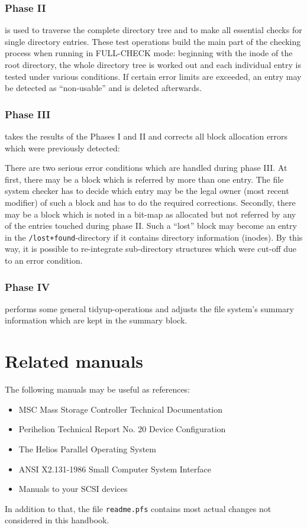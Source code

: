 \subsubsection{Phase II}
is used to traverse the complete directory tree and to make all essential 
checks for single directory entries. These test operations build the main part 
of the checking process when running in FULL-CHECK mode: beginning with the 
inode of the root directory, the whole directory tree is worked out and each 
individual entry is tested under various conditions. If certain error limits are
exceeded, an entry may be detected as ``non-usable'' and is deleted afterwards.

\subsubsection{Phase III}
takes the results of the Phases I and II and corrects all block allocation
errors which were previously detected:

There are two serious error conditions which are handled during phase III. At 
first, there may be a block which is referred by more than one entry. The file
system checker has to decide which entry may be the legal owner (most recent
modifier) of such a block and has to do the required corrections. Secondly, 
there may be a block which is noted in a bit-map as allocated but not referred 
by any of the entries touched during phase II. Such a ``lost'' block may become 
an entry in the 
{\tt /lost+found}-directory if it contains
directory information (inodes). By this way, it is possible to re-integrate
sub-directory structures which were cut-off due to an error condition.

\subsubsection{Phase IV}
performs some general tidyup-operations and adjusts the file system's summary 
information which are kept in the summary block.

\section{Related manuals}
The following manuals may be useful as references:

\begin{itemize}

  \item MSC Mass Storage Controller  Technical Documentation

  \item Perihelion Technical Report No. 20  Device Configuration

  \item The Helios Parallel Operating System

  \item ANSI X2.131-1986 Small Computer System Interface

  \item Manuals to your SCSI devices

\end{itemize}

In addition to that, the file {\tt readme.pfs} contains most actual changes not
considered in this handbook.
